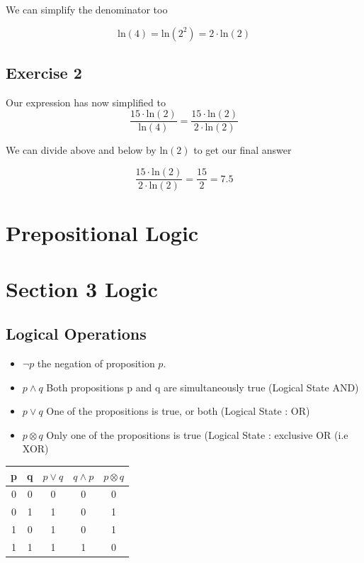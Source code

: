 \documentclass[]{report}
\begin{document}
We can simplify the denominator too

\[ \mbox{ln}(4) =  \mbox{ln}(2^2) = 2 \cdot \mbox{ln}(2) \]



\subsection{Exercise 2}

Our expression has now simplified to 
\[\frac{15 \cdot \mbox{ln}(2) }{\mbox{ln}(4)} = \frac{15 \cdot \mbox{ln}(2) }{2 \cdot \mbox{ln}(2)} \]

We can divide above and below by $\mbox{ln}(2)$ to get our final answer


\[ \frac{15 \cdot \mbox{ln}(2) }{2 \cdot \mbox{ln}(2)} = \frac{15}{2} = 7.5 \]


\section*{Prepositional Logic}


\newpage
\section{Section 3 Logic}
\subsection{Logical Operations}
\begin{itemize}
\item $\neg p$ the negation of proposition $p$.
\item $p \wedge q$ Both propositions p and q are simultaneously true (Logical State AND)
\item $p \vee q $ One of the propositions is true, or both (Logical State : OR)
\item $p \otimes q$ Only one of the propositions is true (Logical State : exclusive OR (i.e XOR)
\end{itemize}
\begin{center}
\begin{tabular}{|c|c|c|c|c|}
\hline
p & q & $p \vee q$ & $q \wedge p$ & $p \otimes q$ \\
\hline
0 & 0 & 0 & 0 & 0 \\
0 & 1 & 1 & 0 & 1\\
1 & 0 & 1 & 0 & 1 \\
1 & 1 & 1 & 1 & 0\\
\hline
\end{tabular}
\end{center}
\end{document}
